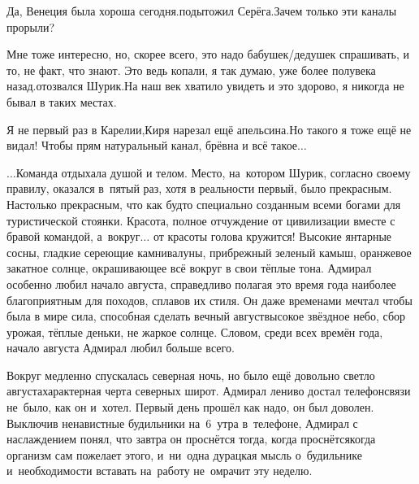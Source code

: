\diagdash Да, Венеция была хороша сегодня.\mdash подытожил Серёга.\mdash Зачем только эти каналы прорыли?

\diagdash Мне тоже интересно, но, скорее всего, это надо бабушек/дедушек спрашивать, и то, не факт, что знают. Это ведь копали, я так думаю, уже более полувека назад.\mdash отозвался Шурик.\mdash На наш век хватило увидеть и это здорово, я никогда не бывал в таких местах.

\diagdash Я не первый раз в Карелии,\mdash Киря нарезал ещё апельсина.\mdash Но такого я тоже ещё не видал! Чтобы прям натуральный канал, брёвна и всё такое$\ldots$

$\ldots$Команда отдыхала душой и телом. Место, на~котором Шурик, согласно своему правилу, оказался в~пятый раз, хотя в реальности первый, было прекрасным. Настолько прекрасным, что как будто специально созданным всеми богами для туристической стоянки. Красота, полное отчуждение от цивилизации вместе с бравой командой, а~вокруг$\ldots$ от красоты голова кружится! Высокие янтарные сосны, гладкие сереющие камни\sdash валуны, прибрежный зеленый камыш, оранжевое закатное солнце, окрашивающее всё вокруг в свои тёплые тона. Адмирал особенно любил начало августа, справедливо полагая это время года наиболее благоприятным для походов, сплавов их стиля. Он даже временами мечтал чтобы была в мире сила, способная сделать вечный август\mdash высокое звёздное небо, сбор урожая, тёплые деньки, не жаркое солнце. Словом, среди всех времён года, начало августа Адмирал любил больше всего.

Вокруг медленно спускалась северная ночь, но было ещё довольно светло августа\mdash характерная черта северных широт. Адмирал лениво достал телефон\mdash связи не~было, как он и~хотел. Первый день прошёл как надо, он был доволен. Выключив ненавистные будильники на~6~утра в~телефоне, Адмирал с наслаждением понял, что завтра он проснётся тогда, когда проснётся\mdash когда организм сам пожелает этого, и~ни~одна дурацкая мысль о~будильнике и~необходимости вставать на~работу не~омрачит эту неделю. 




 






\begin{center}
\end{center}
